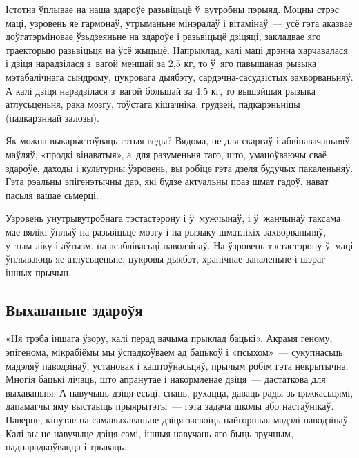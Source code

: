 Істотна ўплывае на наша здароўе разьвіцьцё ў~вутробны пэрыяд. Моцны стрэс маці, узровень яе гармонаў, утрыманьне мінэралаў і вітамінаў~--- усё гэта аказвае доўгатэрміновае ўзьдзеяньне на здароўе і разьвіцьцё дзіцяці, закладвае яго траекторыю разьвіцьця на ўсё жыцьцё. Напрыклад, калі маці дрэнна харчавалася і дзіця нарадзілася з~вагой меншай за 2,5 кг, то ў~яго павышаная рызыка мэтабалічнага сындрому, цукровага дыябэту, сардэчна-сасудзістых захворваньняў. А калі дзіця нарадзілася з~вагой большай за 4,5 кг, то вышэйшая рызыка атлусьценьня, рака мозгу, тоўстага кішачніка, грудзей, падкарэньніцы (падкарэннай залозы).

Як можна выкарыстоўваць гэтыя веды? Вядома, не для скаргаў і абвінавачаньняў, маўляў, «продкі вінаватыя», а~для разуменьня таго, што, умацоўваючы сваё здароўе, даходы і культурны ўзровень, вы робіце гэта дзеля будучых пакаленьняў. Гэта рэальны эпігенэтычны дар, які будзе актуальны праз шмат гадоў, нават пасьля вашае сьмерці.

Узровень унутрывутробнага тэстастэрону і ў~мужчынаў, і ў~жанчынаў таксама мае вялікі ўплыў на разьвіцьцё мозгу і на рызыку шматлікіх захворваньняў, у~тым ліку і аўтызм, на асаблівасьці паводзінаў. На ўзровень тэстастэрону ў~маці ўплываюць яе атлусьценьне, цукровы дыябэт, хранічнае запаленьне і шэраг іншых прычын. 


\subsection*{Выхаваньне здароўя}

«Ня трэба іншага ўзору, калі перад вачыма прыклад бацькі». Акрамя геному, эпігенома, мікрабіёмы мы ўспадкоўваем ад бацькоў і «псыхом»~--- сукупнасьць мадэляў паводзінаў, установак і каштоўнасьцяў, прычым робім гэта некрытычна. Многія бацькі лічаць, што апранутае і накормленае дзіця~--- дастаткова для выхаваньня. А навучыць дзіця есьці, спаць, рухацца, даваць рады зь цяжкасьцямі, дапамагчы яму выставіць прыярытэты~--- гэта задача школы або настаўнікаў. Паверце, кінутае на самавыхаваньне дзіця засвоіць найгоршыя мадэлі паводзінаў. Калі вы не навучыце дзіця самі, іншыя навучаць яго быць зручным, падпарадкоўвацца і трываць.

